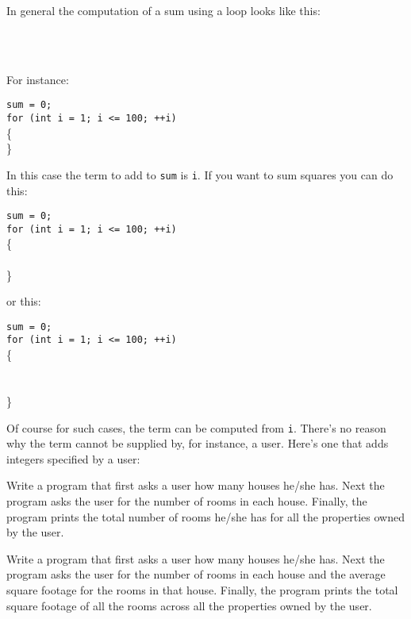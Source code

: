 In general the computation of a sum using a loop looks like this:
\begin{flushleft}
\\
\\
\end{flushleft}
For instance:
\begin{flushleft}
\texttt{sum = 0;}\\
\texttt{for (int i = 1; i <= 100; ++i)}\\
\{
\\
\}
\end{flushleft}
In this case the term to add to \texttt{sum} is \texttt{i}. If you want to
sum squares you can do this:
\begin{flushleft}
\texttt{sum = 0;}\\
\texttt{for (int i = 1; i <= 100; ++i)}\\
\{\\
\\
\}\\
\end{flushleft}
or this:
\begin{flushleft}
\texttt{sum = 0;}\\
\texttt{for (int i = 1; i <= 100; ++i)}\\
\{\\
\\
\\
\}\\
\end{flushleft}
Of course for such cases, the term can be computed from \texttt{i}.
There's no reason why the term cannot be supplied by,
for instance, a user. Here's one that adds integers
specified by a user:
\begin{ex}
 Write a program that first asks a user how many
houses he/she has. Next the program asks the user for the number of
rooms in each house. Finally, the program prints the total number of
rooms he/she has for all the properties owned by the user.
\end{ex}
\begin{ex}
 Write a program that first asks a user how many
houses he/she has. Next the program asks the user for the number of
rooms in each house and the average square footage for the rooms in that
house. Finally, the program prints the total square footage of all the
rooms across all the properties owned by the user.
\end{ex}
\newpage{}

